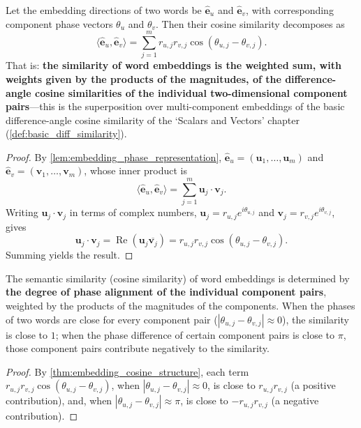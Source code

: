 \begin{theorem}\label{thm:embedding_cosine_structure}
Let the embedding directions of two words be $\widehat{\mathbf{e}}_u$ and $\widehat{\mathbf{e}}_v$, with corresponding component phase vectors $\theta_u$ and $\theta_v$. Then their cosine similarity decomposes as
\[
\langle\widehat{\mathbf{e}}_u,\widehat{\mathbf{e}}_v\rangle
=\sum_{j=1}^m r_{u,j}r_{v,j}\cos(\theta_{u,j}-\theta_{v,j}).
\]
That is: \textbf{the similarity of word embeddings is the weighted sum, with weights given by the products of the magnitudes, of the difference-angle cosine similarities of the individual two-dimensional component pairs}---this is the superposition over multi-component embeddings of the basic difference-angle cosine similarity of the `Scalars and Vectors' chapter (\cref{def:basic_diff_similarity}).
\end{theorem}

\begin{proof}
By \cref{lem:embedding_phase_representation}, $\widehat{\mathbf{e}}_u=(\mathbf{u}_1,\dots,\mathbf{u}_m)$ and $\widehat{\mathbf{e}}_v=(\mathbf{v}_1,\dots,\mathbf{v}_m)$, whose inner product is
\[
\langle\widehat{\mathbf{e}}_u,\widehat{\mathbf{e}}_v\rangle
=\sum_{j=1}^m \mathbf{u}_j\cdot\mathbf{v}_j.
\]
Writing $\mathbf{u}_j\cdot\mathbf{v}_j$ in terms of complex numbers, $\mathbf{u}_j=r_{u,j}e^{i\theta_{u,j}}$ and $\mathbf{v}_j=r_{v,j}e^{i\theta_{v,j}}$, gives
\[
\mathbf{u}_j\cdot\mathbf{v}_j
=\operatorname{Re}(\mathbf{u}_j\overline{\mathbf{v}_j})
=r_{u,j}r_{v,j}\cos(\theta_{u,j}-\theta_{v,j}).
\]
Summing yields the result.
\end{proof}

\begin{corollary}\label{cor:semantic_phase_sum}
The semantic similarity (cosine similarity) of word embeddings is determined by \textbf{the degree of phase alignment of the individual component pairs}, weighted by the products of the magnitudes of the components. When the phases of two words are close for every component pair ($|\theta_{u,j}-\theta_{v,j}|\approx0$), the similarity is close to $1$; when the phase difference of certain component pairs is close to $\pi$, those component pairs contribute negatively to the similarity.
\end{corollary}

\begin{proof}
By \cref{thm:embedding_cosine_structure}, each term $r_{u,j}r_{v,j}\cos(\theta_{u,j}-\theta_{v,j})$, when $|\theta_{u,j}-\theta_{v,j}|\approx0$, is close to $r_{u,j}r_{v,j}$ (a positive contribution), and, when $|\theta_{u,j}-\theta_{v,j}|\approx\pi$, is close to $-r_{u,j}r_{v,j}$ (a negative contribution).
\end{proof}

